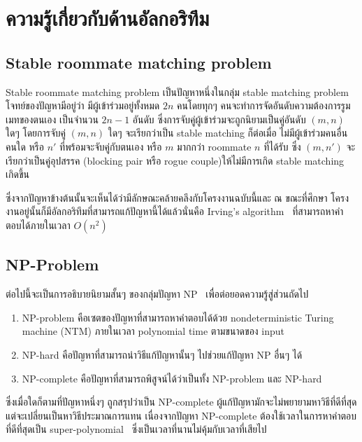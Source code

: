 
\section{ความรู้เกี่ยวกับด้านอัลกอริทึม}
\label{sec:rmp}
\subsection{Stable roommate matching problem}
Stable roommate matching problem เป็นปัญหาหนึ่งในกลุ่ม stable matching problem
โจทย์ของปัญหามีอยู่ว่า มีผู้เข้าร่วมอยู่ทั้งหมด $2n$ คนโดยทุกๆ คนจะทำการจัดอันดับความต้องการรูมเมทของตนเอง
เป็นจำนวน $2n-1$ อันดับ ซึ่งการจับคู่ผู้เข้าร่วมจะถูกนิยามเป็นคู่อันดับ $(m,n)$ ใดๆ โดยการจับคู่ $(m,n)$ ใดๆ จะเรียกว่าเป็น
stable matching ก็ต่อเมื่อ ไม่มีผู้เข้าร่วมคนอื่นคนใด หรือ $n'$ ที่พร้อมจะจับคู่กับตนเอง หรือ $m$ มากกว่า roommate $n$ ที่ได้รับ ซึ่ง $(m, n')$
จะเรียกว่าเป็นคู่อุปสรรค (blocking pair หรือ rogue couple)ให้ไม่มีการเกิด stable matching เกิดขึ้น

ซึ่งจากปัญหาข้างต้นนั้นจะเห็นได้ว่ามีลักษณะคล้ายคลึงกับโครงงานฉบับนี้และ ณ ขณะที่ศึกษา
โครงงานอยู่นั้นก็มีอัลกอริทึมที่สามารถแก้ปัญหานี้ได้แล้วนั่นคือ Irving's algorithm~\cite{irving1985efficient} ที่สามารถหาคำตอบได้ภายในเวลา $O(n^2)$

\subsection{NP-Problem}
ต่อไปนี้จะเป็นการอธิบายนิยามสั้นๆ ของกลุ่มปัญหา NP~\cite{np} เพื่อต่อยอดความรู้สู่ส่วนถัดไป
\begin{enumerate}
      \item NP-problem คือเซตของปัญหาที่สามารถหาคำตอบได้ด้วย nondeterministic 
      Turing machine (NTM) ภายในเวลา polynomial time ตามขนาดของ input
      \item  NP-hard คือปัญหาที่สามารถนำวิธีแก้ปัญหานั้นๆ ไปช่วยแก้ปัญหา NP อื่นๆ ได้
      \item  NP-complete คือปัญหาที่สามารถพิสูจน์ได้ว่าเป็นทั้ง NP-problem และ NP-hard
\end{enumerate}
ซึ่งเมื่อใดก็ตามที่ปัญหาหนึ่งๆ ถูกสรุปว่าเป็น NP-complete ผู้แก้ปัญหามักจะไม่พยายามหาวิธีที่ดีที่สุด
แต่จะเปลี่ยนเป็นหาวิธีประมาณการแทน เนื่องจากปัญหา NP-complete ต้องใช้เวลาในการหาคำตอบที่ดีที่สุดเป็น super-polynomial~\cite{np}
ซึ่งเป็นเวลาที่นานไม่คุ้มกับเวลาที่เสียไป



